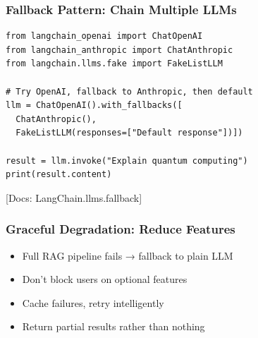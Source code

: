 \documentclass[aspectratio=169,11pt]{beamer}
\newcommand{\docref}[1]{{\scriptsize\color{docgray}[Docs: #1]}}
\begin{document}
\begin{frame}[fragile]
\frametitle{Fallback Pattern: Chain Multiple LLMs}
\vspace{-0.3cm}

\begin{lstlisting}
from langchain_openai import ChatOpenAI
from langchain_anthropic import ChatAnthropic
from langchain.llms.fake import FakeListLLM

# Try OpenAI, fallback to Anthropic, then default
llm = ChatOpenAI().with_fallbacks([
  ChatAnthropic(),
  FakeListLLM(responses=["Default response"])])

result = llm.invoke("Explain quantum computing")
print(result.content)
\end{lstlisting}

\docref{LangChain.llms.fallback}

\end{frame}

\begin{frame}[fragile]
\frametitle{Graceful Degradation: Reduce Features}
\vspace{-0.3cm}

\small
\begin{itemize}
  \item Full RAG pipeline fails → fallback to plain LLM
  \item Don't block users on optional features
  \item Cache failures, retry intelligently
  \item Return partial results rather than nothing
\end{itemize}

\end{frame}
\end{document}
